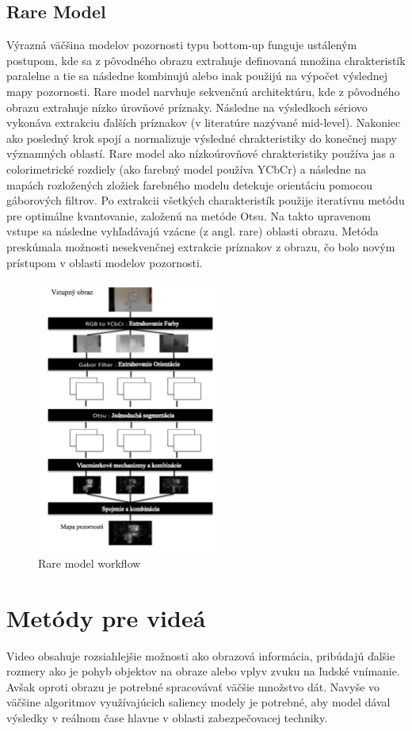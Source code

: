 \subsection{Rare Model}
Výrazná väčšina modelov pozornosti typu bottom-up funguje ustáleným postupom, kde sa z pôvodného obrazu extrahuje definovaná množina chrakteristík paralelne a tie sa následne kombinujú alebo inak použijú na výpočet výslednej mapy pozornosti.
Rare model narvhuje sekvenčnú architektúru, kde z pôvodného obrazu extrahuje nízko úrovňové príznaky.
Následne na výsledkoch sériovo vykonáva extrakciu ďalších príznakov (v literatúre nazývané mid-level).
Nakoniec ako posledný krok spojí a normalizuje výsledné chrakteristiky do konečnej mapy významných oblastí.
Rare model ako nízkoúrovňové chrakteristiky používa jas a colorimetrické rozdiely (ako farebný model používa YCbCr) a následne na mapách rozložených zložiek farebného modelu detekuje orientáciu pomocou gáborových filtrov\cite{rare-1}.
Po extrakcii všetkých charakteristík použije iteratívnu metódu pre optimálne kvantovanie, založenú na metóde Otsu\cite{otsu}.
Na takto upravenom vstupe sa následne vyhľadávajú vzácne (z angl. rare) oblasti obrazu.
Metóda preskúmala možnosti nesekvenčnej extrakcie príznakov z obrazu, čo bolo novým prístupom v oblasti modelov pozornosti.

\begin{figure}[H]
  \centering
  \includegraphics[width=6cm]{pics/rare-1.png}
  \caption{Rare model workflow\cite{rare-1}}\label{wrap-fig:3}
\end{figure}

\section{Metódy pre videá}
Video obsahuje rozsiahlejšie možnosti ako obrazová informácia, pribúdajú ďalšie rozmery ako je pohyb objektov na obraze alebo vplyv zvuku na ľudské vnímanie.
Avšak oproti obrazu je potrebné spracovávať väčšie množstvo dát.
Navyše vo väčšine algoritmov využívajúcich saliency modely je potrebné, aby model dával výsledky v reálnom čase hlavne v oblasti zabezpečovacej techniky.
